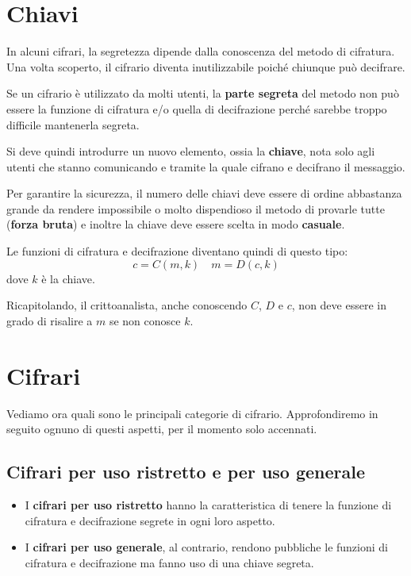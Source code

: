 \section{Chiavi}\label{chiavi}
In alcuni cifrari, la segretezza dipende dalla conoscenza del metodo di cifratura. Una volta scoperto, il cifrario
diventa inutilizzabile poich\'e chiunque pu\`o decifrare.

Se un cifrario \`e utilizzato da molti utenti, la \textbf{parte segreta} del metodo non pu\`o essere la funzione di
cifratura e/o quella di decifrazione perch\'e sarebbe troppo difficile mantenerla segreta.

Si deve quindi introdurre un nuovo elemento, ossia la \textbf{chiave}, nota solo agli utenti che stanno comunicando e
tramite la quale cifrano e decifrano il messaggio.

Per garantire la sicurezza, il numero delle chiavi deve essere di ordine abbastanza grande da rendere impossibile o
molto dispendioso il metodo di provarle tutte (\textbf{forza bruta}) e inoltre la chiave deve essere scelta in modo
\textbf{casuale}.

Le funzioni di cifratura e decifrazione diventano quindi di questo tipo:
\[ c = C(m, k) \quad m = D(c, k) \]
dove $k$ \`e la chiave.

Ricapitolando, il crittoanalista, anche conoscendo $C$, $D$ e $c$, non deve essere in grado di risalire a $m$ se non
conosce $k$.

\section{Cifrari}\label{cifrari}
Vediamo ora quali sono le principali categorie di cifrario. Approfondiremo in seguito ognuno di questi aspetti,
per il momento solo accennati.

\subsection{Cifrari per uso ristretto e per uso generale}
\begin{itemize}
	\item I \textbf{cifrari per uso ristretto} hanno la caratteristica di tenere la funzione di cifratura e
	      decifrazione segrete in ogni loro aspetto.
	\item I \textbf{cifrari per uso generale}, al contrario, rendono pubbliche le funzioni di cifratura e decifrazione
	      ma fanno uso di una chiave segreta.
\end{itemize}

